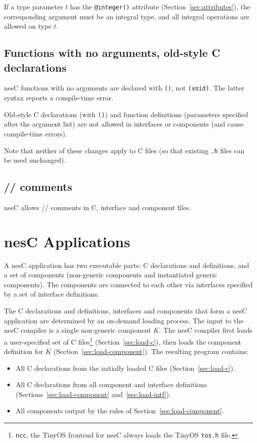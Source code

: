 \documentclass[11pt,letterpaper]{article}
\newcommand{\kw}[1]{{\tt #1}}
\newcommand{\code}[1]{{\tt #1}}
\newcommand{\file}[1]{{\tt #1}}
\newcommand{\nesc}{nesC\xspace}
\begin{document}
If a type parameter $t$ has the \code{@integer()} attribute
(Section~\ref{sec:attributes}), the corresponding argument must be an
integral type, and all integral operations are allowed on type $t$.

\subsection{Functions with no arguments, old-style C declarations}
\label{sec:misc-void}

\nesc functions with no arguments are declared with \code{()}, not
\code{(void)}. The latter syntax reports a compile-time error.

Old-style C declarations (with \code{()}) and function definitions 
(parameters specified after the argument list) are not allowed in
interfaces or components (and cause compile-time errors).

Note that neither of these changes apply to C files (so that existing
\file{.h} files can be used unchanged).

\subsection{// comments}

\nesc allows // comments in C, interface and component files.

\section{\nesc Applications}
\label{sec:app}

A \nesc application has two executable parts: C declarations and
definitions, and a set of components (non-generic components and
instantiated generic components). The components are connected
to each other via interfaces specified by a set of interface
definitions. 

The C declarations and definitions, interfaces and components that form a
\nesc application are determined by an on-demand loading process. The input
to the \nesc compiler is a single non-generic component $K$. The \nesc
compiler first loads a user-specified set of C files\footnote{\kw{ncc}, the
TinyOS frontend for \nesc always loads the TinyOS \file{tos.h} file.}
(Section~\ref{sec:load-c}), then loads the component definition for $K$
(Section~\ref{sec:load-component}). The resulting program contains:
\begin{itemize}
\item All C declarations from the initially loaded C files
(Section~\ref{sec:load-c}).
\item All C declarations from all component and interface definitions
(Sections~\ref{sec:load-component} and~\ref{sec:load-intf}).
\item All components output by the rules of Section~\ref{sec:load-component}.
\end{itemize}
\end{document}
